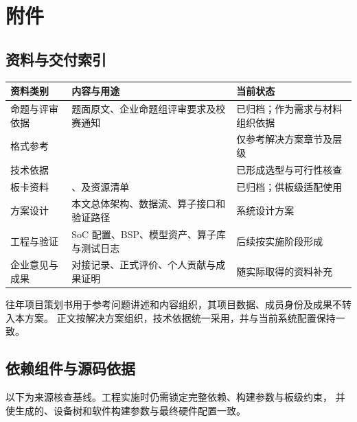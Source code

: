 \section*{附件}
\subsection*{资料与交付索引}
\par{\small\renewcommand{\arraystretch}{1.2}
\noindent\begin{tabularx}{\linewidth}{@{}P{.23\linewidth}YP{.23\linewidth}@{}}
\toprule
资料类别 & 内容与用途 & 当前状态\\
\midrule
命题与评审依据 & 题面原文、企业命题组评审要求及校赛通知 & 已归档；作为需求与材料组织依据\\
格式参考 & \SourceFormatName{} & 仅参考解决方案章节及层级\\
技术依据 & \SourceTechnicalReportName{} & 已形成选型与可行性核查\\
板卡资料 & \SourceBoardName{}、\SourceBoardPinName{}及资源清单 & 已归档；供板级适配使用\\
方案设计 & 本文总体架构、数据流、算子接口和验证路径 & 系统设计方案\\
工程与验证 & SoC 配置、BSP、模型资产、算子库与测试日志 & 后续按实施阶段形成\\
企业意见与成果 & 对接记录、正式评价、个人贡献与成果证明 & 随实际取得的资料补充\\
\bottomrule
\end{tabularx}\par}

往年项目策划书用于参考问题讲述和内容组织，其项目数据、成员身份及成果不转入本方案。
正文按解决方案组织，技术依据统一采用\SourceTechnicalReportName{}，并与当前系统配置保持一致。

\subsection*{依赖组件与源码依据}
以下为来源核查基线。工程实施时仍需锁定完整依赖、构建参数与板级约束，
并使生成的\NpuParameterHeader{}、设备树和软件构建参数与最终硬件配置一致。


